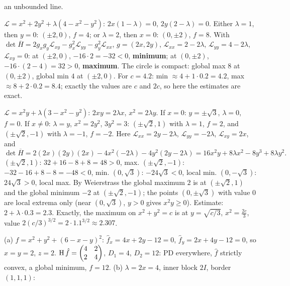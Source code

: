\begin{solutions}
        an unbounded line.
  \item $\mathcal{L}=x^{2}+2y^{2}+\lambda(4-x^{2}-y^{2})$:
        $2x(1-\lambda)=0$, $2y(2-\lambda)=0$. Either $\lambda=1$, then
        $y=0$: $(\pm2,0)$, $f=4$; or $\lambda=2$, then $x=0$: $(0,\pm2)$,
        $f=8$. With $\det\overline{H}=2g_xg_y\mathcal{L}_{xy}
        -g_x^{2}\mathcal{L}_{yy}-g_y^{2}\mathcal{L}_{xx}$, $g=(2x,2y)$,
        $\mathcal{L}_{xx}=2-2\lambda$, $\mathcal{L}_{yy}=4-2\lambda$,
        $\mathcal{L}_{xy}=0$: at $(\pm2,0)$, $-16\cdot2=-32<0$,
        \textbf{minimum}; at $(0,\pm2)$, $-16\cdot(2-4)=32>0$,
        \textbf{maximum}. The circle is compact: global max $8$ at
        $(0,\pm2)$, global min $4$ at $(\pm2,0)$. For $c=4.2$: min
        $\approx4+1\cdot0.2=4.2$, max $\approx8+2\cdot0.2=8.4$; exactly the
        values are $c$ and $2c$, so here the estimates are exact.
  \item $\mathcal{L}=x^{2}y+\lambda(3-x^{2}-y^{2})$: $2xy=2\lambda x$,
        $x^{2}=2\lambda y$. If $x=0$: $y=\pm\sqrt3$, $\lambda=0$, $f=0$. If
        $x\neq0$: $\lambda=y$, $x^{2}=2y^{2}$, $3y^{2}=3$: $(\pm\sqrt2,1)$
        with $\lambda=1$, $f=2$, and $(\pm\sqrt2,-1)$ with $\lambda=-1$,
        $f=-2$. Here $\mathcal{L}_{xx}=2y-2\lambda$,
        $\mathcal{L}_{yy}=-2\lambda$, $\mathcal{L}_{xy}=2x$, and
        \[
          \det\overline{H}=2(2x)(2y)(2x)-4x^{2}(-2\lambda)-4y^{2}(2y-2\lambda)
          =16x^{2}y+8\lambda x^{2}-8y^{3}+8\lambda y^{2}.
        \]
        $(\pm\sqrt2,1)$: $32+16-8+8=48>0$, max. $(\pm\sqrt2,-1)$:
        $-32-16+8-8=-48<0$, min. $(0,\sqrt3)$: $-24\sqrt3<0$, local min.
        $(0,-\sqrt3)$: $24\sqrt3>0$, local max. By Weierstrass the global
        maximum $2$ is at $(\pm\sqrt2,1)$ and the global minimum $-2$ at
        $(\pm\sqrt2,-1)$; the points $(0,\pm\sqrt3)$ with value $0$ are
        local extrema only (near $(0,\sqrt3)$, $y>0$ gives $x^{2}y\ge0$).
        Estimate: $2+\lambda\cdot0.3=2.3$. Exactly, the maximum on
        $x^{2}+y^{2}=c$ is at $y=\sqrt{c/3}$, $x^{2}=\tfrac{2c}3$, value
        $2(c/3)^{3/2}=2\cdot1.1^{3/2}\approx2.307$.
  \item (a) $\hat f=x^{2}+y^{2}+(6-x-y)^{2}$:
        $\hat f_x=4x+2y-12=0$, $\hat f_y=2x+4y-12=0$, so $x=y=2$, $z=2$.
        $\operatorname{H}\hat f=\begin{pmatrix}4&2\\2&4\end{pmatrix}$, $D_1=4$,
        $D_2=12$: PD everywhere, $\hat f$ strictly convex, a global minimum,
        $f=12$. (b) $\lambda=2x=4$, inner block $2I$, border $(1,1,1)$:

\end{solutions}
